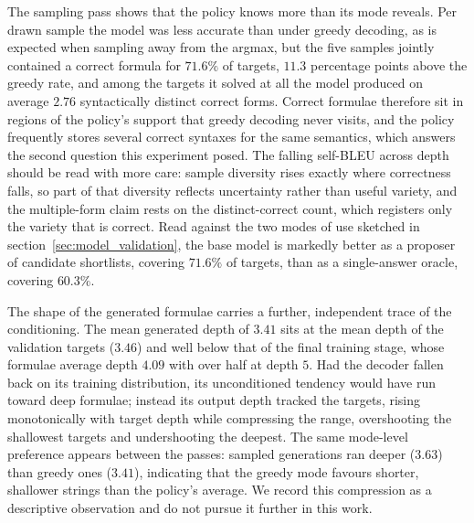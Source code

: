\documentclass[titlepage,a4paper,11pt]{report}
\begin{document}
    The sampling pass shows that the policy knows more than its mode reveals. Per drawn sample the model was less accurate than under greedy decoding, as is expected when sampling away from the argmax, but the five samples jointly contained a correct formula for $71.6\%$ of targets, $11.3$ percentage points above the greedy rate, and among the targets it solved at all the model produced on average $2.76$ syntactically distinct correct forms. Correct formulae therefore sit in regions of the policy's support that greedy decoding never visits, and the policy frequently stores several correct syntaxes for the same semantics, which answers the second question this experiment posed. The falling self-BLEU across depth should be read with more care: sample diversity rises exactly where correctness falls, so part of that diversity reflects uncertainty rather than useful variety, and the multiple-form claim rests on the distinct-correct count, which registers only the variety that is correct. Read against the two modes of use sketched in section~\ref{sec:model_validation}, the base model is markedly better as a proposer of candidate shortlists, covering $71.6\%$ of targets, than as a single-answer oracle, covering $60.3\%$.
    
    The shape of the generated formulae carries a further, independent trace of the conditioning. The mean generated depth of $3.41$ sits at the mean depth of the validation targets ($3.46$) and well below that of the final training stage, whose formulae average depth $4.09$ with over half at depth $5$. Had the decoder fallen back on its training distribution, its unconditioned tendency would have run toward deep formulae; instead its output depth tracked the targets, rising monotonically with target depth while compressing the range, overshooting the shallowest targets and undershooting the deepest. The same mode-level preference appears between the passes: sampled generations ran deeper ($3.63$) than greedy ones ($3.41$), indicating that the greedy mode favours shorter, shallower strings than the policy's average. We record this compression as a descriptive observation and do not pursue it further in this work.
    
\end{document}
